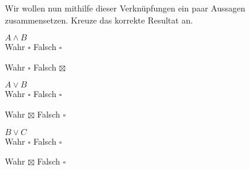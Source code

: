 \begin{exerciseseries}[columns=1,solsubrule=\hrule]{}
    Wir wollen nun mithilfe dieser Verknüpfungen ein paar Aussagen zusammensetzen. Kreuze das korrekte Resultat an.
    \begin{exercise}
        $A \land B$\\
        Wahr $\square$ \hspace{1cm} Falsch $\square$
    \end{exercise}
    \begin{solution}
        Wahr $\square$ \hspace{1cm} Falsch $\boxtimes$
    \end{solution}

    \begin{exercise}
        $A \lor B$\\
        Wahr $\square$ \hspace{1cm} Falsch $\square$
    \end{exercise}
    \begin{solution}
        Wahr $\boxtimes$ \hspace{1cm} Falsch $\square$
    \end{solution}

    \begin{exercise}
        $B \lor C$\\
        Wahr $\square$ \hspace{1cm} Falsch $\square$
    \end{exercise}
    \begin{solution}
        Wahr $\boxtimes$ \hspace{1cm} Falsch $\square$
    \end{solution}
\end{exerciseseries}

